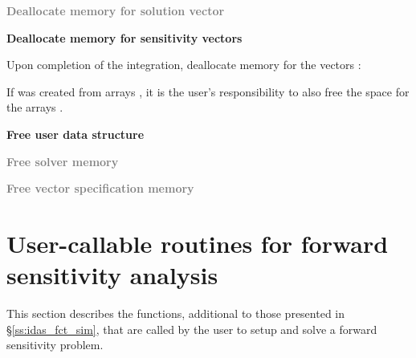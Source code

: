 \begin{Steps}
\item
  \textcolor{gray}{\bf Deallocate memory for solution vector}

\item 
  {\bf Deallocate memory for sensitivity vectors}

  Upon completion of the integration, deallocate memory for the vectors :

  {\s} 

  {\p} 

  If  was created from  arrays , it is the
  user's responsibility to also free the space for the arrays .

\item
  {\bf Free user data structure}

\item
  \textcolor{gray}{\bf Free solver memory}
  
\item
  \textcolor{gray}{\bf Free vector specification memory}

\end{Steps}

\section{User-callable routines for forward sensitivity analysis}

This section describes the {\idas} functions, additional to those presented
in \S\ref{ss:idas_fct_sim}, that are called by the user to setup and solve
a forward sensitivity problem.

